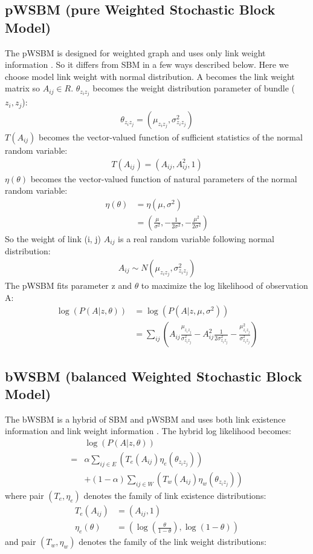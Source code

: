 \documentclass[conference]{IEEEtran}
\begin{document}
\subsection{pWSBM (pure Weighted Stochastic Block Model)}
The pWSBM is designed for weighted graph and uses only link weight information \cite{aicher2014learning}.
So it differs from SBM in a few ways described below.
Here we choose model link weight with normal distribution.
A becomes the link weight matrix so $ A_{ij} \in R $.
$ \theta_{z_i z_j} $ becomes the weight distribution parameter of bundle ($z_i, z_j$):
\begin{align*}
	\theta_{z_i z_j} = (\mu_{z_i z_j}, \sigma_{z_i z_j}^2)
\end{align*}
$ T(A_{ij}) $ becomes the vector-valued function of sufficient statistics of the normal random variable:
\begin{align*}
	T(A_{ij}) = (A_{ij}, A_{ij}^2, 1)
\end{align*}
$ \eta(\theta) $ becomes the vector-valued function of natural parameters of the normal random variable:
\begin{align*}
	\eta(\theta)
	&= \eta(\mu, \sigma^2)\\
	&= (\frac{\mu}{\sigma^2}, -\frac{1}{2\sigma^2}, -\frac{\mu^2}{2\sigma^2})
\end{align*}
So the weight of link (i, j)  $ A_{ij} $ is a real random variable following normal distribution:
\begin{align*}
	A_{ij} \sim N(\mu_{z_i z_j}, \sigma_{z_i z_j}^2)
\end{align*}
The pWSBM fits parameter z and $ \theta $
to maximize the log likelihood of observation A:
\begin{align*}
\log(P(A|z, \theta))
&= \log(P(A|z, \mu, \sigma^2))\\
&= \sum_{ij} (
A_{ij} \frac{\mu_{z_i z_j}}{\sigma_{z_i z_j}^2}
- A_{ij}^2 \frac{1}{2\sigma_{z_i z_j}^2}
- \frac{\mu_{z_i z_j}^2}{\sigma_{z_i z_j}^2}
)
\end{align*}

\subsection{bWSBM (balanced Weighted Stochastic Block Model)}
The bWSBM is a hybrid of SBM and pWSBM
and uses both link existence information and link weight information \cite{aicher2014learning}.
The hybrid log likelihood becomes:
\begin{align*}
&\log(P(A|z, \theta))\\
=& \alpha \sum_{ij \in E} (T_e(A_{ij}) \eta_e(\theta_{z_i z_j}))\\
& + (1 - \alpha) \sum_{ij \in W} (T_w(A_{ij}) \eta_w(\theta_{z_i z_j}))
\end{align*}
where pair $ (T_e, \eta_e) $ denotes the family of link existence distributions:
\begin{align*}
T_e(A_{ij}) &= (A_{ij}, 1)\\
\eta_e(\theta) &= ( \log(\frac{\theta}{1-\theta}), \log(1-\theta) )
\end{align*}
and pair $ (T_w, \eta_w) $ denotes the family of the link weight distributions:
\end{document}
